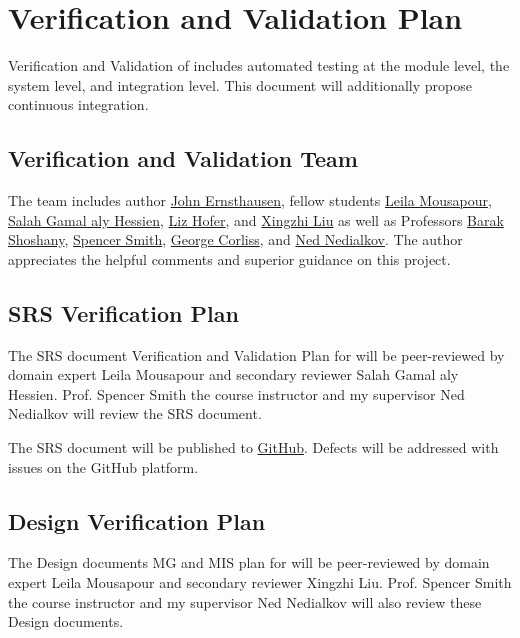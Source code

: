 \documentclass[12pt, titlepage]{article}
\begin{document}
\section{Verification and Validation Plan}

Verification and Validation of  includes automated testing at the module level,
the system level, and integration level. This document will additionally propose continuous integration.

\subsection{Verification and Validation Team}

The  team includes
author
\href{https://github.com/JohnErnsthausen}{John Ernsthausen},
fellow students
\href{https://github.com/LeilaMousapour}{Leila Mousapour},
\href{https://github.com/salahhessien}{Salah Gamal aly Hessien},
\href{https://github.com/liziscool}{Liz Hofer},
and
\href{https://github.com/XingzhiMac}{Xingzhi Liu} as well as Professors
\href{http://baraksh.com}{Barak Shoshany},
\href{https://github.com/smiths}{Spencer Smith},
\href{https://www.cs.mu.edu/~george/}{George Corliss},
and
\href{http://www.cas.mcmaster.ca/~nedialk}{Ned Nedialkov}.
The author appreciates the helpful comments and superior guidance on this project.

\subsection{SRS Verification Plan}

The SRS document Verification and Validation Plan for  will be peer-reviewed by
domain expert Leila Mousapour and secondary reviewer Salah Gamal aly Hessien.
Prof. Spencer Smith the course instructor and my supervisor Ned Nedialkov will review the SRS
document.

The SRS document will be published to \href{https://github.com/JohnErnsthausen/roc}{GitHub}.
Defects will be addressed with issues on the GitHub platform.

\subsection{Design Verification Plan}

The Design documents MG and MIS plan for  will be peer-reviewed by
domain expert Leila Mousapour and secondary reviewer Xingzhi Liu.
Prof. Spencer Smith the course instructor and my supervisor Ned Nedialkov will also review these Design
documents.
\end{document}
